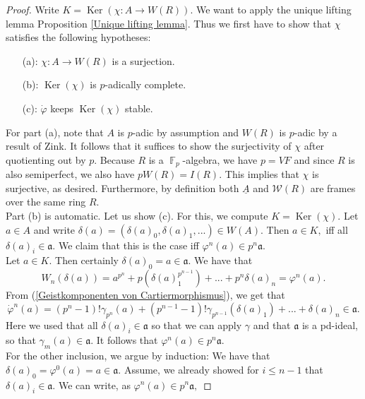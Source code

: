 \documentclass[a4paper,10,5 pt]{amsart}
\theoremstyle{definition}
\DeclareMathOperator{\Ker}{Ker}
\DeclareMathOperator{\F}{\mathbb{F}}
\begin{document}
\begin{proof}
Write $K=\Ker(\chi\colon A\rightarrow W(R)).$
We want to apply the unique lifting lemma Proposition \ref{Unique lifting lemma}. Thus we first have to show that $\chi$ satisfies the following hypotheses:
\begin{enumerate}
\item[(a):] $\chi\colon A\rightarrow W(R)$ is a surjection.
\item[(b):] $\Ker(\chi)$ is $p$-adically complete.
\item[(c):] $\dot{\varphi}$ keeps $\Ker(\chi)$ stable.
\end{enumerate}
For part (a), note that $A$ is $p$-adic by assumption and $W(R)$ is $p$-adic by a result of Zink. It follows that it suffices to show the surjectivity of $\chi$ after quotienting out by $p.$ Because $R$ is a $\F_{p}$-algebra, we have $p=VF$ and since $R$ is also semiperfect, we also have $pW(R)=I(R).$ This implies that $\chi$ is surjective, as desired. Furthermore, by definition both $\underline{A}$ and $\mathcal{W}(R)$ are frames over the same ring $R.$
\\ Part (b) is automatic. Let us show (c). For this, we compute $K=\Ker(\chi).$ Let $a\in A$ and write $\delta(a)=(\delta(a)_{0},\delta(a)_{1},...)\in W(A).$ Then $a\in K,$ iff all $\delta(a)_{i}\in \mathfrak{a}.$ We claim that this is the case iff $\varphi^{n}(a)\in p^{n}\mathfrak{a}.$
\\
Let $a\in K.$ Then certainly $\delta(a)_{0}=a\in \mathfrak{a}.$ We have that
\begin{equation}\label{Geistkomponenten von Cartiermorphismus}
W_{n}(\delta(a))=a^{p^{n}}+p(\delta(a)_{1}^{p^{n-1}})+...+p^{n}\delta(a)_{n}=\varphi^{n}(a).
\end{equation}
From (\ref{Geistkomponenten von Cartiermorphismus}), we get that
\begin{equation}
\dot{\varphi}^{n}(a)=(p^{n}-1)!\gamma_{p^{n}}(a)+(p^{n-1}-1)!\gamma_{p^{n-1}}(\delta(a)_{1})+...+\delta(a)_{n}\in \mathfrak{a}.
\end{equation}
Here we used that all $\delta(a)_{i}\in \mathfrak{a}$ so that we can apply $\gamma$ and that $\mathfrak{a}$ is a pd-ideal, so that $\gamma_{m}(a)\in \mathfrak{a}.$ It follows that $\varphi^{n}(a)\in p^{n}\mathfrak{a}.$
\\
For the other inclusion, we argue by induction: We have that $\delta(a)_{0}=\varphi^{0}(a)=a\in\mathfrak{a}.$ Assume, we already showed for $i\leq n-1$ that $\delta(a)_{i}\in \mathfrak{a}.$ We can write, as $\varphi^{n}(a)\in p^{n}\mathfrak{a},$

\end{proof}
\end{document}
